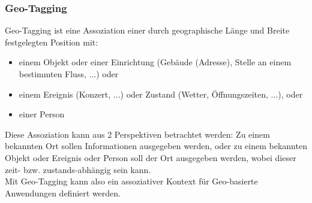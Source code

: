 \subsubsection{Geo-Tagging}\label{sec:GL:GEOTAG}
Geo-Tagging ist eine Assoziation einer durch geographische Länge und Breite festgelegten Position mit:
\begin{itemize}
\item einem Objekt oder einer Einrichtung (Gebäude (Adresse), Stelle an einem bestimmten Fluss, ...) oder
\item einem Ereignis (Konzert, ...) oder Zustand (Wetter, Öffnungszeiten, ...), oder
\item einer Person
\end{itemize}
Diese Assoziation kann aus 2 Perspektiven betrachtet werden: Zu einem bekannten Ort sollen Informationen ausgegeben werden, oder zu einem bekannten Objekt oder Ereignis oder Person soll der Ort ausgegeben werden, wobei dieser zeit- bzw. zustands-abhängig sein kann.\\
Mit Geo-Tagging kann also ein assoziativer Kontext für Geo-basierte Anwendungen definiert werden.

